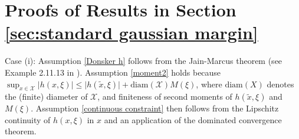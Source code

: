 \documentclass[mnsc,blindrev]{informs4} %
\begin{document}
\section{Proofs of Results in Section \ref{sec:standard gaussian margin}}\label{sec:proofs univariate}
Case (i): Assumption \ref{Donsker h} follows from the Jain-Marcus theorem (see Example 2.11.13 in \cite{van1996weak}). Assumption \ref{moment2} holds because $\sup_{x\in\mathcal X}\lvert h(x,\xi)\rvert\leq \lvert h(\tilde x,\xi)\rvert+\mathrm{diam}(\mathcal X)M(\xi)$, where $\mathrm{diam}(X)$ denotes the (finite) diameter of $\mathcal X$, and finiteness of second moments of $h(\tilde x,\xi)$ and $M(\xi)$. Assumption \ref{continuous constraint} then follows from the Lipschitz continuity of $h(x,\xi)$ in $x$ and an application of the dominated convergence theorem.
\end{document}

